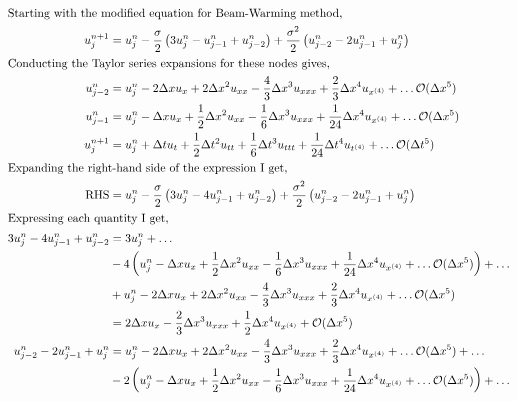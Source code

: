 \begin{enumerate}[label=\alph*., start = 1]
    \vspace{-0.35in}
    \begin{align*}
        \shortintertext{Starting with the modified equation for Beam-Warming method,}
        u_j^{n+1} & = u_j^n - \frac{\sigma}{2}\left(3u_j^n - u_{j-1}^n + u_{j-2}^n\right) + \frac{\sigma^2}{2}\left(u_{j-2}^n - 2u_{j-1}^n + u_j^n\right)\\
        \shortintertext{Conducting the Taylor series expansions for these nodes gives,}
        u_{j-2}^n & = u_j^n - 2\Delta xu_x + 2\Delta x^2 u_{xx} - \frac{4}{3}\Delta x^3u_{xxx} + \frac{2}{3}\Delta x^4u_{x^{(4)}} + \ldots \mathcal{O}(\Delta x^5)\\
        u_{j-1}^n & = u_j^n - \Delta x u_x + \frac{1}{2}\Delta x^2 u_{xx} - \frac{1}{6}\Delta x^3 u_{xxx} + \frac{1}{24}\Delta x^4 u_{x^{(4)}} + \ldots \mathcal{O}(\Delta x^5)\\
        u_{j}^{n+1} & = u_j^n + \Delta tu_t + \frac{1}{2}\Delta t^2u_{tt} + \frac{1}{6}\Delta t^3 u_{ttt} + \frac{1}{24}\Delta t^4u_{t^{(4)}} + \ldots \mathcal{O}(\Delta t^5)\\
        \shortintertext{Expanding the right-hand side of the expression I get,}
        \text{RHS} & = u_j^n - \frac{\sigma}{2}\left(3u_j^n - 4u_{j-1}^n + u_{j-2}^n\right) + \frac{\sigma^2}{2}\left(u_{j-2}^n - 2u_{j-1}^n + u_j^n\right)\\
        \shortintertext{Expressing each quantity I get,}
        3u_j^n - 4u_{j-1}^n + u_{j-2}^n & = 3u_j^n + \ldots\\
        & - 4\left(u_j^n - \Delta x u_x + \frac{1}{2}\Delta x^2 u_{xx} - \frac{1}{6}\Delta x^3 u_{xxx} + \frac{1}{24}\Delta x^4 u_{x^{(4)}} + \ldots \mathcal{O}(\Delta x^5)\right) + \ldots\\
        & + u_j^n - 2\Delta xu_x + 2\Delta x^2 u_{xx} - \frac{4}{3}\Delta x^3u_{xxx} + \frac{2}{3}\Delta x^4u_{x^{(4)}} + \ldots \mathcal{O}(\Delta x^5)\\
        & = 2\Delta xu_x - \frac{2}{3}\Delta x^3 u_{xxx} + \frac{1}{2}\Delta x^4u_{x^{(4)}} + \mathcal{O}(\Delta x^5)\\
        u_{j-2}^n - 2u_{j-1}^n + u_j^n & = u_j^n - 2\Delta xu_x + 2\Delta x^2 u_{xx} - \frac{4}{3}\Delta x^3u_{xxx} + \frac{2}{3}\Delta x^4u_{x^{(4)}} + \ldots \mathcal{O}(\Delta x^5) + \ldots \\
        & -2\left(u_j^n - \Delta x u_x + \frac{1}{2}\Delta x^2 u_{xx} - \frac{1}{6}\Delta x^3 u_{xxx} + \frac{1}{24}\Delta x^4 u_{x^{(4)}} + \ldots \mathcal{O}(\Delta x^5)\right) + \ldots \\

\end{align*}
\end{enumerate}

